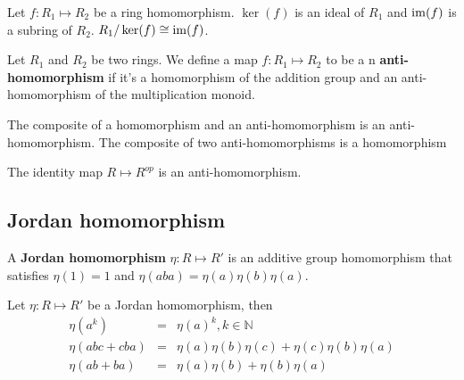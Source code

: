 \documentclass[12pt]{book}
\begin{document}
\begin{lemma}
	Let $f:R_1\mapsto R_2$ be a ring homomorphism. $\ker(f)$ is an ideal of $R_1$ and ${\rm im} (f)$ is a subring of $R_2$. $R_1/\ker(f)\cong{\rm im}(f)$.
\end{lemma}	

\begin{definition}
	Let $R_1$ and $R_2$ be two rings. We define a map $f:R_1\mapsto R_2$ to be a n {\bf anti-homomorphism} if it's a homomorphism of the addition group and an anti-homomorphism of the multiplication monoid.
\end{definition}

\begin{lemma}
	The composite of a homomorphism and an anti-homomorphism is an anti-homomorphism. The composite of two anti-homomorphisms is a homomorphism
\end{lemma}

\begin{lemma}
	The identity map $R\mapsto R^{op}$ is an anti-homomorphism.
\end{lemma}

\subsection{Jordan homomorphism}

\begin{definition}
	A {\bf Jordan homomorphism} $\eta: R\mapsto R'$ is an additive group homomorphism that satisfies $\eta(1)=1$ and $\eta(aba)=\eta(a)\eta(b)\eta(a)$.
\end{definition}

\begin{lemma}
	Let $\eta: R\mapsto R'$ be a Jordan homomorphism, then
	\begin{eqnarray}
		\eta(a^k)&=&\eta(a)^k, k\in \mathbb N\\
		\eta(abc+cba)&=&\eta(a)\eta(b)\eta(c)+\eta(c)\eta(b)\eta(a)\\
		\eta(ab+ba)&=&\eta(a)\eta(b)+\eta(b)\eta(a)
	\end{eqnarray}
\end{lemma}
\end{document}
